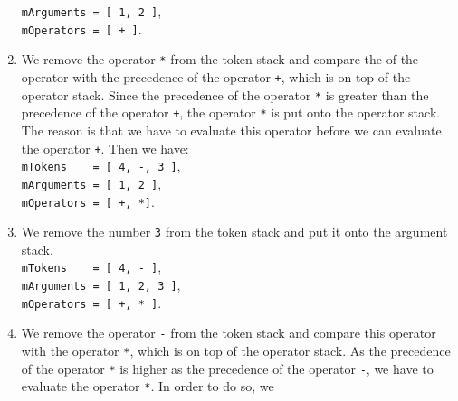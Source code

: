 \begin{enumerate}
      \hspace*{1.3cm} \texttt{mArguments = [ 1, 2 ]}, \\[0.2cm]
      \hspace*{1.3cm} \texttt{mOperators = [ + ]}. 
\item We remove the operator \texttt{*} from the  token stack and compare the
       of the operator with the precedence of the operator \texttt{+},
      which is on top of the operator stack.  Since the precedence of the operator 
      \texttt{*} is greater than the precedence of the operator 
      \texttt{+}, the operator \texttt{*} is put onto
      the operator stack.  The reason is that we have to evaluate this operator before we can
      evaluate the operator \texttt{+}.  Then we have: 
      \\[0.2cm]
      \hspace*{1.3cm} \texttt{mTokens \ \ \ = [ 4, -, 3 ]}, \\[0.2cm]
      \hspace*{1.3cm} \texttt{mArguments = [ 1, 2 ]}, \\[0.2cm]
      \hspace*{1.3cm} \texttt{mOperators = [ +, *]}. 
\item We remove the number \texttt{3} from the  token stack and put it onto the argument stack.
      \\[0.2cm]
      \hspace*{1.3cm} \texttt{mTokens \ \ \ = [ 4, - ]}, \\[0.2cm]
      \hspace*{1.3cm} \texttt{mArguments = [ 1, 2, 3 ]}, \\[0.2cm]
      \hspace*{1.3cm} \texttt{mOperators = [ +, * ]}. 
\item We remove the operator \texttt{-} from the token stack and
      compare this operator with the operator \texttt{*}, which is on top of
      the operator stack.  As the precedence of the  operator \texttt{*} is
      higher as the precedence of the operator \texttt{-},
      we have to evaluate the operator \texttt{*}.  In order to do so, we

\end{enumerate}
